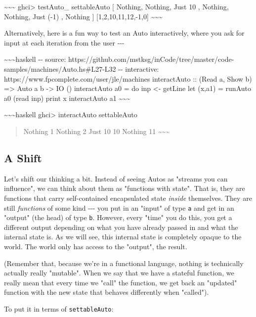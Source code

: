 \documentclass[]{article}
\begin{document}
\textasciitilde{}\textasciitilde{}\textasciitilde{} ghci\textgreater{}
testAuto\_ settableAuto {[} Nothing, Nothing, Just 10 , Nothing, Nothing, Just
(-1) , Nothing {]} {[}1,2,10,11,12,-1,0{]}
\textasciitilde{}\textasciitilde{}\textasciitilde{}

Alternatively, here is a fun way to test an Auto interactively, where you ask
for input at each iteration from the user -\/-\/-

\textasciitilde{}\textasciitilde{}\textasciitilde{}haskell -\/- source:
https://github.com/mstksg/inCode/tree/master/code-samples/machines/Auto.hs\#L27-L32
-\/- interactive: https://www.fpcomplete.com/user/jle/machines interactAuto ::
(Read a, Show b) =\textgreater{} Auto a b -\textgreater{} IO () interactAuto a0
= do inp \textless{}- getLine let (x,a1) = runAuto a0 (read inp) print x
interactAuto a1 \textasciitilde{}\textasciitilde{}\textasciitilde{}

\textasciitilde{}\textasciitilde{}\textasciitilde{}haskell ghci\textgreater{}
interactAuto settableAuto

\begin{quote}
Nothing 1 Nothing 2 Just 10 10 Nothing 11
\textasciitilde{}\textasciitilde{}\textasciitilde{}
\end{quote}

\subsection{A Shift}

Let's shift our thinking a bit. Instead of seeing Autos as "streams you can
influence", we can think about them as "functions with state". That is, they are
functions that carry self-contained encapsulated state \emph{inside} themselves.
They are still \emph{functions} of some kind -\/-\/- you put in an "input" of
type \texttt{a} and get in an "output" (the head) of type \texttt{b}. However,
every "time" you do this, you get a different output depending on what you have
already passed in and what the internal state is. As we will see, this internal
state is completely opaque to the world. The world only has access to the
"output", the result.

(Remember that, because we're in a functional language, nothing is technically
actually really "mutable". When we say that we have a stateful function, we
really mean that every time we "call" the function, we get back an "updated"
function with the new state that behaves differently when "called").

To put it in terms of \texttt{settableAuto}:
\end{document}
